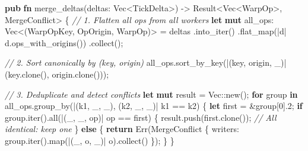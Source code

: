 \documentclass[
]{book}
\newenvironment{Shaded}{}{}
\newcommand{\CommentTok}[1]{\textcolor[rgb]{0.38,0.63,0.69}{\textit{#1}}}
\newcommand{\ConstantTok}[1]{\textcolor[rgb]{0.53,0.00,0.00}{#1}}
\newcommand{\ControlFlowTok}[1]{\textcolor[rgb]{0.00,0.44,0.13}{\textbf{#1}}}
\newcommand{\DataTypeTok}[1]{\textcolor[rgb]{0.56,0.13,0.00}{#1}}
\newcommand{\DecValTok}[1]{\textcolor[rgb]{0.25,0.63,0.44}{#1}}
\newcommand{\KeywordTok}[1]{\textcolor[rgb]{0.00,0.44,0.13}{\textbf{#1}}}
\newcommand{\NormalTok}[1]{#1}
\newcommand{\OperatorTok}[1]{\textcolor[rgb]{0.40,0.40,0.40}{#1}}
\newcommand{\PreprocessorTok}[1]{\textcolor[rgb]{0.74,0.48,0.00}{#1}}
\begin{document}
\begin{Shaded}
\begin{Highlighting}[]
\KeywordTok{pub} \KeywordTok{fn}\NormalTok{ merge\_deltas(deltas}\OperatorTok{:} \DataTypeTok{Vec}\OperatorTok{\textless{}}\NormalTok{TickDelta}\OperatorTok{\textgreater{}}\NormalTok{) }\OperatorTok{{-}\textgreater{}} \DataTypeTok{Result}\OperatorTok{\textless{}}\DataTypeTok{Vec}\OperatorTok{\textless{}}\NormalTok{WarpOp}\OperatorTok{\textgreater{},}\NormalTok{ MergeConflict}\OperatorTok{\textgreater{}} \OperatorTok{\{}
    \CommentTok{// 1. Flatten all ops from all workers}
    \KeywordTok{let} \KeywordTok{mut}\NormalTok{ all\_ops}\OperatorTok{:} \DataTypeTok{Vec}\OperatorTok{\textless{}}\NormalTok{(WarpOpKey}\OperatorTok{,}\NormalTok{ OpOrigin}\OperatorTok{,}\NormalTok{ WarpOp)}\OperatorTok{\textgreater{}} \OperatorTok{=}\NormalTok{ deltas}
        \OperatorTok{.}\NormalTok{into\_iter()}
        \OperatorTok{.}\NormalTok{flat\_map(}\OperatorTok{|}\NormalTok{d}\OperatorTok{|}\NormalTok{ d}\OperatorTok{.}\NormalTok{ops\_with\_origins())}
        \OperatorTok{.}\NormalTok{collect()}\OperatorTok{;}

    \CommentTok{// 2. Sort canonically by (key, origin)}
\NormalTok{    all\_ops}\OperatorTok{.}\NormalTok{sort\_by\_key(}\OperatorTok{|}\NormalTok{(key}\OperatorTok{,}\NormalTok{ origin}\OperatorTok{,}\NormalTok{ \_)}\OperatorTok{|}\NormalTok{ (key}\OperatorTok{.}\NormalTok{clone()}\OperatorTok{,}\NormalTok{ origin}\OperatorTok{.}\NormalTok{clone()))}\OperatorTok{;}

    \CommentTok{// 3. Deduplicate and detect conflicts}
    \KeywordTok{let} \KeywordTok{mut}\NormalTok{ result }\OperatorTok{=} \DataTypeTok{Vec}\PreprocessorTok{::}\NormalTok{new()}\OperatorTok{;}
    \ControlFlowTok{for}\NormalTok{ group }\KeywordTok{in}\NormalTok{ all\_ops}\OperatorTok{.}\NormalTok{group\_by(}\OperatorTok{|}\NormalTok{(k1}\OperatorTok{,}\NormalTok{ \_}\OperatorTok{,}\NormalTok{ \_)}\OperatorTok{,}\NormalTok{ (k2}\OperatorTok{,}\NormalTok{ \_}\OperatorTok{,}\NormalTok{ \_)}\OperatorTok{|}\NormalTok{ k1 }\OperatorTok{==}\NormalTok{ k2) }\OperatorTok{\{}
        \KeywordTok{let}\NormalTok{ first }\OperatorTok{=} \OperatorTok{\&}\NormalTok{group[}\DecValTok{0}\NormalTok{]}\OperatorTok{.}\DecValTok{2}\OperatorTok{;}
        \ControlFlowTok{if}\NormalTok{ group}\OperatorTok{.}\NormalTok{iter()}\OperatorTok{.}\NormalTok{all(}\OperatorTok{|}\NormalTok{(\_}\OperatorTok{,}\NormalTok{ \_}\OperatorTok{,}\NormalTok{ op)}\OperatorTok{|}\NormalTok{ op }\OperatorTok{==}\NormalTok{ first) }\OperatorTok{\{}
\NormalTok{            result}\OperatorTok{.}\NormalTok{push(first}\OperatorTok{.}\NormalTok{clone())}\OperatorTok{;}  \CommentTok{// All identical: keep one}
        \OperatorTok{\}} \ControlFlowTok{else} \OperatorTok{\{}
            \ControlFlowTok{return} \ConstantTok{Err}\NormalTok{(MergeConflict }\OperatorTok{\{}\NormalTok{ writers}\OperatorTok{:}\NormalTok{ group}\OperatorTok{.}\NormalTok{iter()}\OperatorTok{.}\NormalTok{map(}\OperatorTok{|}\NormalTok{(\_}\OperatorTok{,}\NormalTok{ o}\OperatorTok{,}\NormalTok{ \_)}\OperatorTok{|}\NormalTok{ o)}\OperatorTok{.}\NormalTok{collect() }\OperatorTok{\}}\NormalTok{)}\OperatorTok{;}
        \OperatorTok{\}}
    \OperatorTok{\}}


\end{Highlighting}
\end{Shaded}
\end{document}
